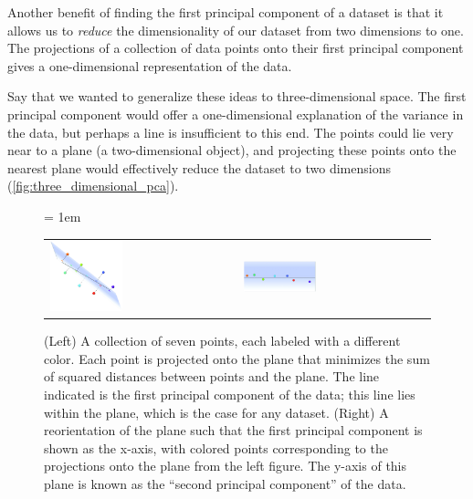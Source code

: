 Another benefit of finding the first principal component of a dataset is that it allows us to \textit{reduce} the dimensionality of our dataset from two dimensions to one. The projections of a collection of data points onto their first principal component gives a one-dimensional representation of the data.

Say that we wanted to generalize these ideas to three-dimensional space. The first principal component would offer a one-dimensional explanation of the variance in the data, but perhaps a line is insufficient to this end. The points could lie very near to a plane (a two-dimensional object), and projecting these points onto the nearest plane would effectively reduce the dataset to two dimensions (\autoref{fig:three_dimensional_pca}).\\

\begin{figure}[h]
\centering
\mySfFamily
\tabcolsep = 1em
\begin{tabular}{m{} m{}}
\includegraphics[width = 0.4\textwidth]{../images_CMYK/three_dimensional_pca} &
\includegraphics[width = 0.4\textwidth]{../images_CMYK/three_dimensional_pca_plane}
\end{tabular}
\caption{(Left) A collection of seven points, each labeled with a different color. Each point is projected onto the plane that minimizes the sum of squared distances between points and the plane. The line indicated is the first principal component of the data; this line lies within the plane, which is the case for any dataset. (Right) A reorientation of the plane such that the first principal component is shown as the x-axis, with colored points corresponding to the projections onto the plane from the left figure. The y-axis of this plane is known as the ``second principal component'' of the data.}
\label{fig:three_dimensional_pca}
\end{figure}

